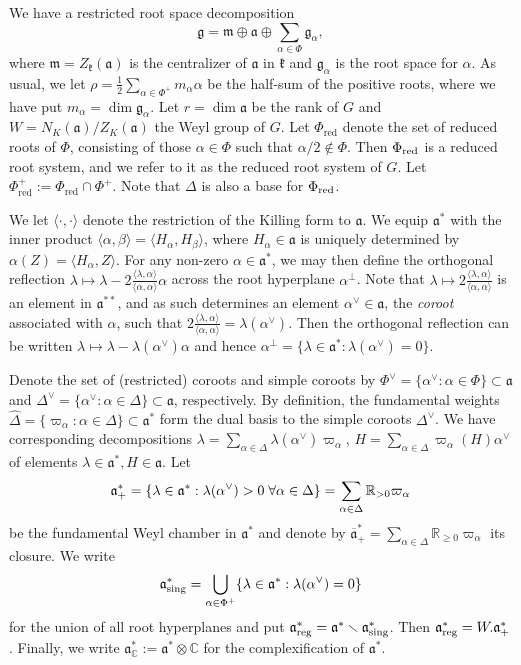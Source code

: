 \documentclass[12pt]{amsart}
\theoremstyle{remark}
\newcommand{\R}{\mathbb R}
\newcommand{\g}{\mathfrak g}
\newcommand{\ga}{\mathfrak a}
\begin{document}
We have a restricted root space decomposition
\[
\g=\mathfrak{m}\oplus\ga\oplus\sum_{\alpha\in\Phi}\g_\alpha,
\]
where $\mathfrak{m}=Z_{\mathfrak{k}}(\ga)$ is the centralizer of $\ga$ in $\mathfrak{k}$ and $\g_\alpha$ is the root space for $\alpha$. As usual, we let $\rho=\frac{1}{2}\sum_{\alpha\in\Phi^+}m_\alpha \alpha$ be the half-sum of the positive roots, where we have put $m_\alpha=\dim\g_\alpha$. Let $r=\dim\ga$ be the rank of $G$ and $W=N_K(\ga)/Z_K(\ga)$ the Weyl group of $G$. Let $\Phi_\text{red}$ denote the set of reduced roots of $\Phi$, consisting of those $\alpha\in\Phi$ such that $\alpha/2\notin\Phi$. Then $\Phi_\textnormal{red}$ is a reduced root system, and we refer to it as the reduced root system of $G$. Let $\Phi_\text{red}^+ := \Phi_\text{red} \cap \Phi^+$. Note that $\Delta$ is also a base for $\Phi_{\textnormal{red}}$. 

We let $\langle \cdot ,\cdot\rangle$ denote the restriction of the Killing form to $\ga$. We equip $\ga^*$ with the inner product $\langle \alpha ,\beta \rangle =\langle H_\alpha, H_\beta\rangle$, where $H_\alpha\in\ga$ is uniquely determined by $\alpha(Z)=\langle H_\alpha, Z\rangle$. For any non-zero $\alpha\in\ga^*$, we may then define the orthogonal reflection $\lambda\mapsto \lambda-2\frac{\langle\lambda,\alpha\rangle}{\langle\alpha,\alpha\rangle}\alpha$ across the root hyperplane $\alpha^\perp$. Note that $\lambda\mapsto 2\frac{\langle\lambda,\alpha\rangle}{\langle \alpha,\alpha \rangle}$ is an element in $\ga^{**}$, and as such determines an element $\alpha^\vee\in\ga$, the \textit{coroot} associated with $\alpha$, such that $2\frac{\langle \lambda,\alpha \rangle}{\langle \alpha,\alpha \rangle}=\lambda(\alpha^\vee)$.  Then the orthogonal reflection can be written $\lambda\mapsto\lambda-\lambda(\alpha^\vee)\alpha$ and hence $\alpha^\perp=
\{\lambda\in\ga^*: \lambda(\alpha^\vee)=0\}$. 


Denote the set of (restricted) coroots and simple coroots by $\Phi^\vee=\{\alpha^\vee: \alpha\in\Phi\}\subset\ga$ and $\Delta^\vee=\{\alpha^\vee: \alpha\in\Delta\}\subset\ga$, respectively. By definition, the fundamental weights $\widehat{\Delta}=\{\varpi_\alpha: \alpha\in \Delta\}\subset\ga^*$ form the dual basis to the simple coroots $\Delta^\vee$. We have corresponding decompositions $\lambda=\sum_{\alpha\in\Delta} \lambda(\alpha^\vee)\varpi_\alpha$, $H=\sum_{\alpha\in\Delta}\varpi_\alpha(H)\alpha^\vee$ of elements $\lambda\in\ga^*, H\in\ga$. Let
\[
\ga_+^*=\{\lambda\in\ga^*: \lambda(\alpha^\vee)>0\;\forall\alpha\in\Delta\}=\sum_{\alpha\in\Delta} \R_{> 0}\varpi_\alpha\\
\]
be the fundamental Weyl chamber in $\ga^*$ and denote by $\overline{\ga}_+^*=\sum_{\alpha\in\Delta} \R_{\ge 0}\varpi_\alpha$ its closure. We write
\begin{equation}\label{eq:reg-sing}
\ga^*_{\rm sing}=\bigcup_{\alpha\in\Phi^+} \{\lambda\in\ga^*: \lambda(\alpha^\vee)=0\}
\end{equation}
for the union of all root hyperplanes and put $\ga^*_{\rm reg}=\ga^*\smallsetminus \ga^*_{\rm sing}$. Then $\ga^*_{\rm reg}=W.\ga_+^*$. Finally, we write $\mathfrak{a}^*_\mathbb{C} := \mathfrak{a}^* \otimes \mathbb{C}$ for the complexification of $\mathfrak{a}^*$.
\end{document}
